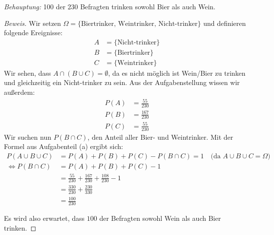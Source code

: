 \documentclass[10pt]{article}
\begin{document}
\textit{Behauptung: } 100 der 230 Befragten trinken sowohl Bier als auch Wein.
\begin{proof}[Beweis]
Wir setzen $\Omega = \{\text{Biertrinker, Weintrinker, Nicht-trinker}\}$ und definieren folgende Ereignisse: 
\begin{align*}
    A &= \{\text{Nicht-trinker}\} \\
    B &= \{\text{Biertrinker}\} \\
    C &= \{\text{Weintrinker}\}
\end{align*}
Wir sehen, dass $A \cap (B \cup C) = \emptyset$, da es nicht möglich ist Wein/Bier zu trinken und gleichzeitig ein Nicht-trinker zu sein.
Aus der Aufgabenstellung wissen wir außerdem:
\begin{align*}
    P(A) &= \frac{55}{230} \\
    P(B) &= \frac{167}{230} \\
    P(C) &= \frac{55}{230}
\end{align*}
Wir suchen nun $P(B\cap C)$, den Anteil aller Bier- und Weintrinker. Mit der Formel aus Aufgabenteil (a) ergibt sich:
\begin{align*}
P(A \cup B \cup C) &= P(A) + P(B) + P(C) - P(B \cap C) = 1 \quad\text{(da $A\cup B\cup C = \Omega$)} \\
\Leftrightarrow P(B \cap C) &= P(A) + P(B) + P(C) - 1 \\
&= \frac{55}{230} + \frac{167}{230} + \frac{108}{230} - 1 \\
&= \frac{330}{230} + \frac{230}{330} \\
&= \frac{100}{230}
\end{align*}

Es wird also erwartet, dass $100$ der Befragten sowohl Wein als auch Bier trinken.
\end{proof}
\end{document}
